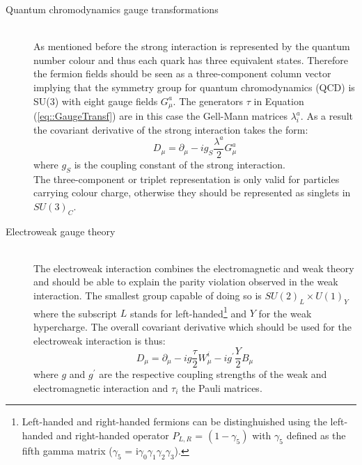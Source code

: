 \begin{myindentpar}
  \begin{description}
    \item[Quantum chromodynamics gauge transformations] \hfill \\
    As mentioned before the strong interaction is represented by the quantum number colour and thus each quark has three equivalent states. Therefore the fermion fields should be seen as a three-component column vector implying that the symmetry group for quantum chromodynamics (QCD) is SU(3) with eight gauge fields $G_{\mu}^{a}$. 
    The generators $\tau$ in Equation (\ref{eq::GaugeTransf}) are in this case the Gell-Mann matrices $\lambda_{i}^{a}$. As a result the covariant derivative of the strong interaction takes the form:
    \begin{equation}
      D_{\mu} = \partial_{\mu} - i g_{S} \frac{\lambda^{a}}{2} G_{\mu}^a
    \end{equation}
    where $g_{S}$ is the coupling constant of the strong interaction. \\
    The three-component or triplet representation is only valid for particles carrying colour charge, otherwise they should be represented as singlets in $SU(3)_{C}$. 
    
    \item[Electroweak gauge theory] \hfill \\
    The electroweak interaction combines the electromagnetic and weak theory and should be able to explain the parity violation observed in the weak interaction. The smallest group capable of doing so is $SU(2)_{L} \times U(1)_{Y}$ where the subscript $L$ stands for left-handed\footnote{
      Left-handed and right-handed fermions can be distinghuished using the left-handed and right-handed operator $P_{L,R}$ = $(1 - \gamma_{5})$ with $\gamma_5$ defined as the fifth gamma matrix ($\gamma_5$ = i$\gamma_0 \gamma_1 \gamma_2 \gamma_3$). 
    }
    and $Y$ for the weak hypercharge.
    The overall covariant derivative which should be used for the electroweak interaction is thus:
    \begin{equation}
     D_{\mu} = \partial_{\mu} - i g \frac{\tau}{2} W_{\mu}^{i} - i g^{'} \frac{Y}{2} B_{\mu}
    \end{equation}
    where $g$ and $g^{'}$ are the respective coupling strengths of the weak and electromagnetic interaction and $\tau_{i}$ the Pauli matrices. 
    

\end{description}
\end{myindentpar}

